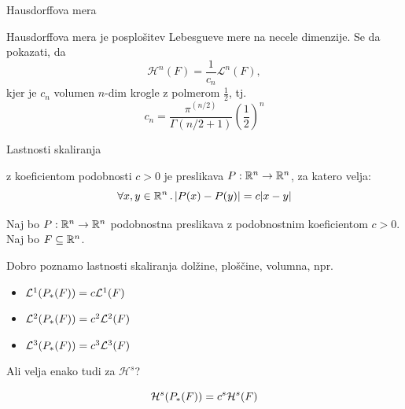 \documentclass[10pt]{beamer}
\begin{document}
\begin{frame}[t]{Hausdorffova mera}
    \begin{opomba}
        Hausdorffova mera je posplošitev Lebesgueve mere na necele dimenzije. Se da pokazati, da 
        \[\mathcal{H}^n(F) = \frac{1}{c_n} \mathcal{L}^n(F),\]
        kjer je \(c_n\) volumen \(n\)-dim krogle z polmerom \(\frac{1}{2}\), tj. 
        \[c_n = \frac{\pi^{(n/2)}}{\Gamma(n/2 + 1)} \left(\frac{1}{2}\right)^n\]
    \end{opomba}  
\end{frame}

\begin{frame}[t]{Lastnosti skaliranja}
     {
        \begin{definicija}
             z koeficientom podobnosti \(c > 0\) je preslikava \(P: \mathbb{R}^n \to \mathbb{R}^n\), za katero velja:
            \[\forall x, y \in \mathbb{R}^n \,.\, |P(x) - P(y)| = c|x-y|\]
        \end{definicija}
    }
    \pause
    Naj bo \(P: \mathbb{R}^n \to \mathbb{R}^n\) podobnostna preslikava z podobnostnim koeficientom \(c > 0\). Naj bo \(F \subseteq \mathbb{R}^n\).
    
     {
        Dobro poznamo lastnosti skaliranja dolžine, ploščine, volumna, npr.
        \begin{itemize}
            \item \(\mathcal{L}^1(P_{*}(F)) = c \mathcal{L}^1(F)\)
            \item \(\mathcal{L}^2(P_{*}(F)) = c^2 \mathcal{L}^2(F)\)
            \item \(\mathcal{L}^3(P_{*}(F)) = c^3 \mathcal{L}^3(F)\)
        \end{itemize}
        Ali velja enako tudi za \(\mathcal{H}^s\)?
    }
    \pause
    \begin{trditev}
        \[\mathcal{H}^s(P_{*}(F)) = c^s \mathcal{H}^s(F)\]
    \end{trditev}   
\end{frame}

    
\end{document}

